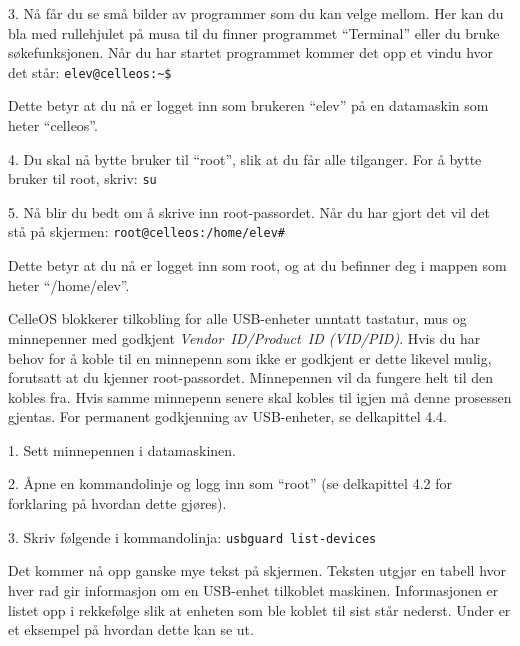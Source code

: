 \item{3.} N\aa{} f\aa r du se sm\aa{} bilder av programmer som du kan velge mellom. Her kan du bla med rullehjulet p\aa{} musa til du finner programmet ``Terminal'' eller du bruke s\o kefunksjonen. N\aa r du har startet programmet kommer det opp et vindu hvor det st\aa r:
\medskip
{\tt elev@celleos:\~{}\$}
\medskip
\item{} Dette betyr at du n\aa{} er logget inn som brukeren ``elev'' p\aa{} en datamaskin som heter ``celleos''.
\item{4.} Du skal n\aa{} bytte bruker til ``root'', slik at du f\aa r alle tilganger. For \aa{} bytte bruker til root, skriv:
\medskip
{\tt su}
\medskip
\item{5.} N\aa{} blir du bedt om \aa{} skrive inn root-passordet. N\aa r du har gjort det vil det st\aa{} p\aa{} skjermen:
\medskip
{\tt root@celleos:/home/elev\#}
\medskip
\item{} Dette betyr at du n\aa{} er logget inn som root, og at du befinner deg i mappen som heter ``/home/elev''.


CelleOS blokkerer tilkobling for alle USB-enheter unntatt tastatur, mus og minnepenner med godkjent {\it Vendor~ID/Product~ID (VID/PID)}. Hvis du har behov for \aa{} koble til en minnepenn som ikke er godkjent er dette likevel mulig, forutsatt at du kjenner root-passordet. Minnepennen vil da fungere helt til den kobles fra. Hvis samme minnepenn senere skal kobles til igjen m\aa{} denne prosessen gjentas. For permanent godkjenning av USB-enheter, se delkapittel 4.4.
\item{1.} Sett minnepennen i datamaskinen.
\item{2.} \AA pne en kommandolinje og logg inn som ``root'' (se delkapittel 4.2 for forklaring p\aa{} hvordan dette gj\o res).
\item{3.} Skriv f\o lgende i kommandolinja:
\medskip
{\tt usbguard list-devices}
\medskip
\item{} Det kommer n\aa{} opp ganske mye tekst p\aa{} skjermen. Teksten utgj\o r en tabell hvor hver rad gir informasjon om en USB-enhet tilkoblet maskinen. Informasjonen er listet opp i rekkef\o lge slik at enheten som ble koblet til sist st\aa r nederst. Under er et eksempel p\aa{} hvordan dette kan se ut.

\medskip
\centerline{\epsfxsize 8cm }
\medskip

